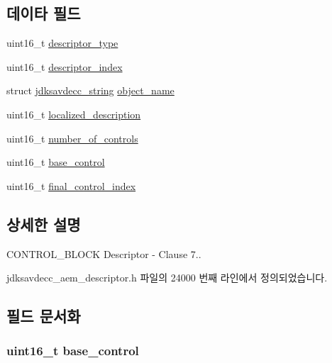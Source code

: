 \subsection*{데이타 필드}
\begin{DoxyCompactItemize}
\item 
uint16\+\_\+t \hyperlink{structjdksavdecc__descriptor__control__block_ab7c32b6c7131c13d4ea3b7ee2f09b78d}{descriptor\+\_\+type}
\item 
uint16\+\_\+t \hyperlink{structjdksavdecc__descriptor__control__block_a042bbc76d835b82d27c1932431ee38d4}{descriptor\+\_\+index}
\item 
struct \hyperlink{structjdksavdecc__string}{jdksavdecc\+\_\+string} \hyperlink{structjdksavdecc__descriptor__control__block_a7d1f5945a13863b1762fc6db74fa8f80}{object\+\_\+name}
\item 
uint16\+\_\+t \hyperlink{structjdksavdecc__descriptor__control__block_a0926f846ca65a83ad5bb06b4aff8f408}{localized\+\_\+description}
\item 
uint16\+\_\+t \hyperlink{structjdksavdecc__descriptor__control__block_a0104bea638bdadf1a547c2b93813e22f}{number\+\_\+of\+\_\+controls}
\item 
uint16\+\_\+t \hyperlink{structjdksavdecc__descriptor__control__block_af06eac7dd98377a85258308e8a25e7f2}{base\+\_\+control}
\item 
uint16\+\_\+t \hyperlink{structjdksavdecc__descriptor__control__block_a6853bf58b4f94780a8c4b05bbaad059a}{final\+\_\+control\+\_\+index}
\end{DoxyCompactItemize}


\subsection{상세한 설명}
C\+O\+N\+T\+R\+O\+L\+\_\+\+B\+L\+O\+CK Descriptor -\/ Clause 7.. 

jdksavdecc\+\_\+aem\+\_\+descriptor.\+h 파일의 24000 번째 라인에서 정의되었습니다.



\subsection{필드 문서화}
\subsubsection[{\texorpdfstring{base\+\_\+control}{base_control}}]{\setlength{\rightskip}{0pt plus 5cm}uint16\+\_\+t base\+\_\+control}\hypertarget{structjdksavdecc__descriptor__control__block_af06eac7dd98377a85258308e8a25e7f2}{}\label{structjdksavdecc__descriptor__control__block_af06eac7dd98377a85258308e8a25e7f2}


